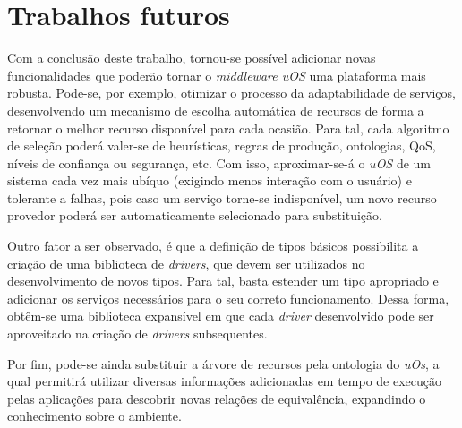 \section{Trabalhos futuros}
\label{sec:trabalhosFuturos}

Com a conclusão deste trabalho, tornou-se possível adicionar novas funcionalidades que poderão tornar o \emph{middleware uOS} uma plataforma mais robusta. Pode-se, por exemplo, otimizar o processo da adaptabilidade de serviços, desenvolvendo um mecanismo de escolha automática de recursos de forma a retornar o melhor recurso disponível para cada ocasião. Para tal, cada algoritmo de seleção poderá valer-se de heurísticas, regras de produção, ontologias, QoS, níveis de confiança ou segurança, etc. Com isso, aproximar-se-á o \emph{uOS} de um sistema cada vez mais ubíquo (exigindo menos interação com o usuário) e tolerante a falhas, pois caso um serviço torne-se indisponível, um novo recurso provedor poderá ser automaticamente selecionado para substituição.

Outro fator a ser observado, é que a definição de tipos básicos possibilita a criação de uma biblioteca de \emph{drivers}, que devem ser utilizados no desenvolvimento de novos tipos. Para tal, basta estender um tipo apropriado e adicionar os serviços necessários para o seu correto funcionamento. Dessa forma, obtêm-se uma biblioteca expansível em que cada \emph{driver} desenvolvido pode ser aproveitado na criação de \emph{drivers} subsequentes.

Por fim, pode-se ainda substituir a árvore de recursos pela ontologia do \emph{uOs}, a qual permitirá utilizar diversas informações adicionadas em tempo de execução pelas aplicações para descobrir novas relações de  equivalência, expandindo o conhecimento sobre o ambiente.
